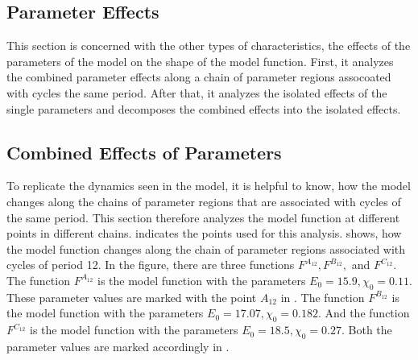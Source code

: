 \subsection{Parameter Effects}
\label{sec:setup.char.paramfx}

This section is concerned with the other types of characteristics, the effects of the parameters of the model on the shape of the model function.
First, it analyzes the combined parameter effects along a chain of parameter regions assocoated with cycles the same period.
After that, it analyzes the isolated effects of the single parameters and decomposes the combined effects into the isolated effects.

\subsection{Combined Effects of Parameters}
\label{sec:setup.char.paramfx.combined}

To replicate the dynamics seen in the model, it is helpful to know, how the model changes along the chains of parameter regions that are associated with cycles of the same period.
This section therefore analyzes the model function at different points in different chains.
 indicates the points used for this analysis.
 shows, how the model function changes along the chain of parameter regions associated with cycles of period 12.
In the figure, there are three functions $F^{A_12}, F^{B_12},$ and $F^{C_12}$.
The function $F^{A_{12}}$ is the model function with the parameters $E_0 = 15.9, \chi_0 = 0.11$.
These parameter values are marked with the point $A_{12}$ in .
The function $F^{B_{12}}$ is the model function with the parameters $E_0 = 17.07, \chi_0 = 0.182$.
And the function $F^{C_{12}}$ is the model function with the parameters $E_0 = 18.5, \chi_0 = 0.27$.
Both the parameter values are marked accordingly in .

